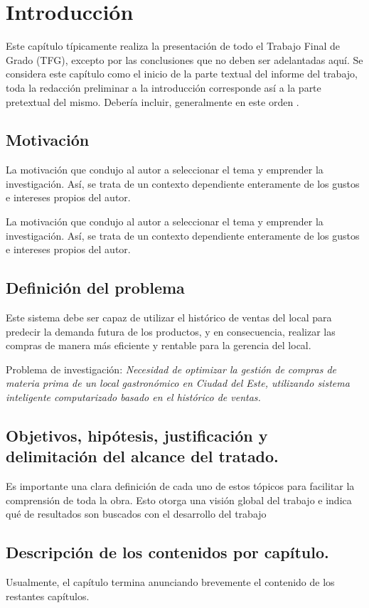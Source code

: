 \fancyhead{}
\fancyfoot{}
\cfoot{\thepage}

\chapter{Introducción}

Este capítulo típicamente realiza la presentación de todo el Trabajo Final de Grado (TFG), excepto por las conclusiones que no deben ser adelantadas aquí. Se considera este capítulo como el inicio de la parte textual del informe del trabajo, toda la redacción preliminar a la introducción corresponde así a la parte pretextual del mismo. Debería incluir, generalmente en este orden \cite{sampieri}.

\section{Motivación}
La motivación que condujo al autor a seleccionar el tema y emprender la investigación. Así, se trata de un contexto dependiente enteramente de los gustos e intereses propios del autor.

La motivación que condujo al autor a seleccionar el tema y emprender la investigación. Así, se trata de un contexto dependiente enteramente de los gustos e intereses propios del autor.

\section{Definición del problema}
 Este sistema debe ser capaz de utilizar el histórico de ventas del local para predecir
la demanda futura de los productos, y en consecuencia, realizar las compras
de manera más eficiente y rentable para la gerencia del local.

Problema de investigación: \textit{Necesidad de optimizar la gestión de compras de materia prima de un
local gastronómico en Ciudad del Este, utilizando sistema inteligente computarizado basado en el histórico de ventas.}

\section{Objetivos, hipótesis, justificación y delimitación del alcance del tratado.}
Es importante una clara definición de cada uno de estos tópicos para facilitar la comprensión de toda la obra. Esto otorga una visión global del trabajo e indica qué de resultados son buscados con el desarrollo del trabajo







\section{Descripción de los contenidos por capítulo.} 
Usualmente, el capítulo termina anunciando brevemente el contenido de los restantes capítulos.

